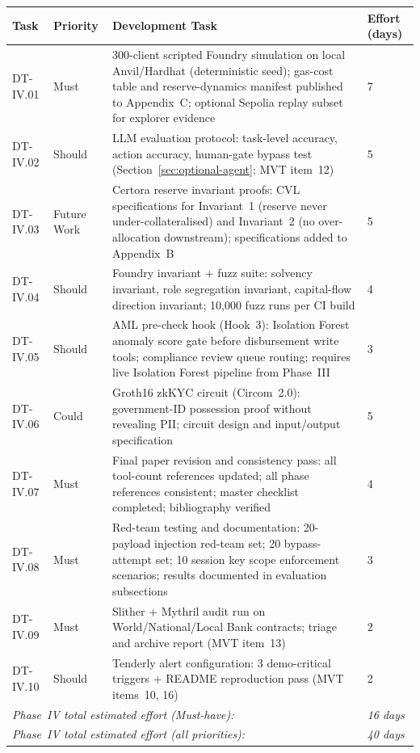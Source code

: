 \documentclass[12pt,a4paper]{report}
\newcommand{\tableheadcolor}{\rowcolor{TableHeadBg}}
\begin{document}
\begin{table}[H]
\centering
\begin{tabular}{p{1.8cm}p{1.8cm}p{7.5cm}p{1.5cm}}
\toprule
\tableheadcolor
\textbf{Task} & \textbf{Priority} & \textbf{Development Task} & \textbf{Effort (days)} \\
\midrule
DT-IV.01 & Must & 300-client scripted Foundry simulation on local Anvil/Hardhat (deterministic seed); gas-cost table and reserve-dynamics manifest published to Appendix~C; optional Sepolia replay subset for explorer evidence & 7 \\
DT-IV.02 & Should & LLM evaluation protocol: task-level accuracy, action accuracy, human-gate bypass test (Section~\ref{sec:optional-agent}; MVT item~12) & 5 \\
DT-IV.03 & Future Work & Certora reserve invariant proofs: CVL specifications for Invariant~1 (reserve never under-collateralised) and Invariant~2 (no over-allocation downstream); specifications added to Appendix~B & 5 \\
DT-IV.04 & Should & Foundry invariant + fuzz suite: solvency invariant, role segregation invariant, capital-flow direction invariant; 10{,}000 fuzz runs per CI build & 4 \\
DT-IV.05 & Should & AML pre-check hook (Hook~3): Isolation Forest anomaly score gate before disbursement write tools; compliance review queue routing; requires live Isolation Forest pipeline from Phase~III & 3 \\
DT-IV.06 & Could & Groth16 zkKYC circuit (Circom~2.0): government-ID possession proof without revealing PII; circuit design and input/output specification & 5 \\
DT-IV.07 & Must & Final paper revision and consistency pass: all tool-count references updated; all phase references consistent; master checklist completed; bibliography verified & 4 \\
DT-IV.08 & Must & Red-team testing and documentation: 20-payload injection red-team set; 20 bypass-attempt set; 10 session key scope enforcement scenarios; results documented in evaluation subsections & 3 \\
DT-IV.09 & Must & Slither + Mythril audit run on World/National/Local Bank contracts; triage and archive report (MVT item~13) & 2 \\
DT-IV.10 & Should & Tenderly alert configuration: 3 demo-critical triggers + README reproduction pass (MVT items~10, 16) & 2 \\
\multicolumn{3}{l}{\textit{Phase~IV total estimated effort (Must-have):}} & \textit{16 days} \\
\multicolumn{3}{l}{\textit{Phase~IV total estimated effort (all priorities):}} & \textit{40 days} \\
\bottomrule
\end{tabular}
\end{table}
\end{document}
